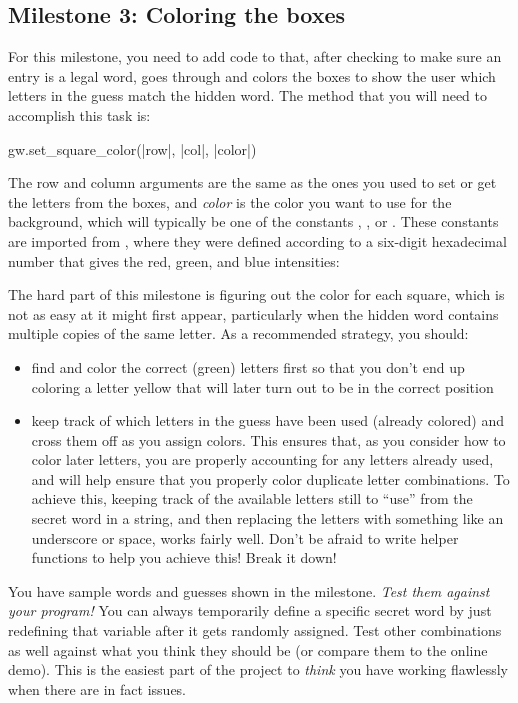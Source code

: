 \documentclass[letterpaper,12pt]{exam}
\begin{document}
\subsection{Milestone 3: Coloring the boxes}
For this milestone, you need to add code to  that, after checking to make sure an entry is a legal word, goes through and colors the boxes to show the user which letters in the guess match the hidden word. The method that you will need to accomplish this task is:
\begin{pythoncode}[style=syntax]
	gw.set_square_color(|row|, |col|, |color|)
\end{pythoncode}
The row and column arguments are the same as the ones you used to set or get the letters from the boxes, and \emph{color} is the color you want to use for the background, which will typically be one of the constants , , or . These constants are imported from , where they were defined according to a six-digit hexadecimal number that gives the red, green, and blue intensities:

The hard part of this milestone is figuring out the color for each square, which is not as easy at it might first appear, particularly when the hidden word contains multiple copies of the same letter. As a recommended strategy, you should:
\begin{itemize}
	\item find and color the correct (green) letters first so that you don't end up coloring a letter yellow that will later turn out to be in the correct position
	\item keep track of which letters in the guess have been used (already colored) and cross them off as you assign colors. This ensures that, as you consider how to color later letters, you are properly accounting for any letters already used, and will help ensure that you properly color duplicate letter combinations. To achieve this, keeping track of the available letters still to ``use'' from the secret word in a string, and then replacing the letters with something like an underscore or space, works fairly well. Don't be afraid to write helper functions to help you achieve this! Break it down!
\end{itemize}
You have sample words and guesses shown in the milestone. \emph{Test them against your program!} You can always temporarily define a specific secret word by just redefining that variable after it gets randomly assigned. Test other combinations as well against what you think they should be (or compare them to the online demo). This is the easiest part of the project to \emph{think} you have working flawlessly when there are in fact issues.
\end{document}
